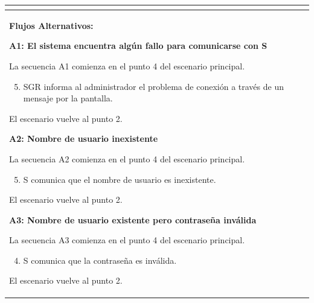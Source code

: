 \begin{longtable}{|l|p{5.5cm}|l|p{2cm}|l|p{1.9cm}|}
{					} \\ \hline

					\multicolumn{6}{|p{15cm}|}{ \textbf{Flujos Alternativos: }

					\textbf{A1: El sistema encuentra algún fallo para comunicarse con S}
					
					La secuencia A1 comienza en el punto 4 del escenario principal.
					\begin{enumerate}
							\setcounter{enumi}{4}
							\item SGR informa al administrador el problema de conexión a través de un mensaje por la pantalla.
					\end{enumerate}

					El escenario vuelve al punto 2.

					\textbf{A2: Nombre de usuario inexistente}
					
					La secuencia A2 comienza en el punto 4 del escenario principal.
					\begin{enumerate}
							\setcounter{enumi}{4}
							\item S comunica que el nombre de usuario es inexistente.
					\end{enumerate}

					El escenario vuelve al punto 2.

					\textbf{A3: Nombre de usuario existente pero contraseña inválida}
					
					La secuencia A3 comienza en el punto 4 del escenario principal.
					\begin{enumerate}
							\setcounter{enumi}{3}
							\item S comunica que la contraseña es inválida.
					\end{enumerate}

					El escenario vuelve al punto 2.

					} \\ \hline

			\end{longtable}

